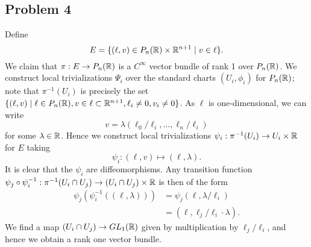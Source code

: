 \documentclass{../mathnotes}
\begin{document}
\subsection*{Problem 4}
Define
\[E=\{(\ell,v)\in P_n(\mathbb{R})\times\mathbb{R}^{n+1}\mid v\in\ell\}.\]
We claim that $\pi:E\to P_n(\mathbb{R})$ is a $C^\infty$ vector bundle of rank 1 over $P_n(\mathbb{R})$.
We construct local trivializations $\Psi_i$ over the standard charts $(U_i,\phi_i)$ for $P_n(\mathbb{R})$;
note that $\pi^{-1}(U_i)$ is precisely the set $\{(\ell,v)\mid \ell\in P_n(\mathbb{R}),v\in\ell\subset\mathbb{R}^{n+1},\ell_i\neq0,v_i\neq 0\}$.
As $\ell$ is one-dimensional, we can write 
\[v=\lambda(\ell_0/\ell_i,\ldots,\ell_n/\ell_i)\]
for some $\lambda\in\mathbb{R}$. Hence we construct local trivializations $\psi_i:\pi^{-1}(U_i)\to U_i\times\mathbb{R}$ for $E$ taking
\[\psi_i:(\ell,v)\mapsto (\ell,\lambda).\]
It is clear that the $\psi_i$ are diffeomorphisms. Any transition function
$\psi_j\circ\psi_i^{-1}:\pi^{-1}(U_i\cap U_j)\to (U_i\cap U_j)\times\mathbb{R}$ is then of the form
\begin{align*}
    \psi_j(\psi_i^{-1}((\ell,\lambda))) &= \psi_j(\ell,\lambda/\ell_i)\\
    &= (\ell,\ell_j/\ell_i\cdot\lambda).
\end{align*}
We find a map $(U_i\cap U_j)\to GL_1(\mathbb{R})$ given by multiplication by $\ell_j/\ell_i$, and hence we
obtain a rank one vector bundle.
\end{document}
